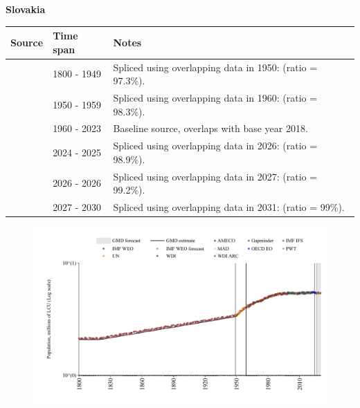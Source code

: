 \documentclass[12pt,a4paper,landscape]{article}
\begin{document}
\begin{adjustbox}{max totalsize={\paperwidth}{\paperheight},center}
\begin{minipage}[t][\textheight][t]{\textwidth}
\vspace*{0.5cm}
{}
\begin{center}
{\Large\bfseries Slovakia}
\end{center}
\vspace{0.5cm}
\begin{table}[H]
\centering
\small
\begin{tabular}{|l|l|l|}
\hline
\textbf{Source} & \textbf{Time span} & \textbf{Notes} \\
\hline
\rowcolor{white}\cite{Gapminder}& 1800 - 1949 &Spliced using overlapping data in 1950: (ratio = 97.3\%).\\
\rowcolor{lightgray}\cite{IMF_IFS}& 1950 - 1959 &Spliced using overlapping data in 1960: (ratio = 98.3\%).\\
\rowcolor{white}\cite{WDI}& 1960 - 2023 &Baseline source, overlaps with base year 2018.\\
\rowcolor{lightgray}\cite{OECD_EO}& 2024 - 2025 &Spliced using overlapping data in 2026: (ratio = 98.9\%).\\
\rowcolor{white}\cite{AMECO}& 2026 - 2026 &Spliced using overlapping data in 2027: (ratio = 99.2\%).\\
\rowcolor{lightgray}\cite{Gapminder}& 2027 - 2030 &Spliced using overlapping data in 2031: (ratio = 99\%).\\
\hline
\end{tabular}
\end{table}
\begin{figure}[H]
\centering
\includegraphics[width=\textwidth,height=0.6\textheight,keepaspectratio]{graphs/SVK_pop.pdf}
\end{figure}
\end{minipage}
\end{adjustbox}
\end{document}
